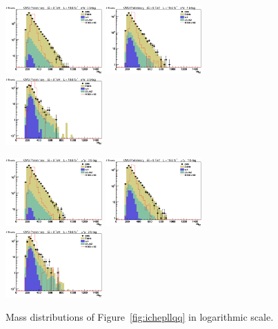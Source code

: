 \begin{figure}[htb]
\begin{center}
\centerline{
\includegraphics[width=0.33\textwidth]{presentation/defense/images/final/0/el/mZZ_signal_log.eps}
\includegraphics[width=0.33\textwidth]{presentation/defense/images/final/1/el/mZZ_signal_log.eps}
\includegraphics[width=0.33\textwidth]{presentation/defense/images/final/2/el/mZZ_signal_log.eps}
}
\centerline{
\includegraphics[width=0.33\textwidth]{presentation/defense/images/final/0/mu/mZZ_signal_log.eps}
\includegraphics[width=0.33\textwidth]{presentation/defense/images/final/1/mu/mZZ_signal_log.eps}
\includegraphics[width=0.33\textwidth]{presentation/defense/images/final/2/mu/mZZ_signal_log.eps}
}
\caption{Mass distributions of Figure~\ref{fig:ichepllqq} in logarithmic scale.
}
\label{fig:ichepllqqLOG}
\end{center}
\end{figure}
